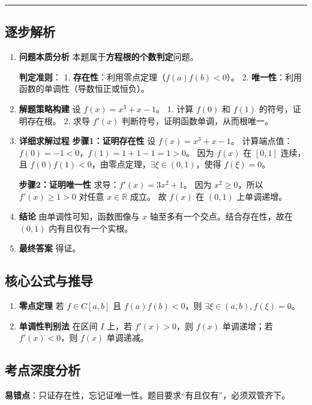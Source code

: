 \documentclass[UTF8]{ctexart}
\newenvironment{redenv}{\color{red}}{}
\newenvironment{detailedanalysis}{%
    \color{red}
    \begin{enumerate}[label=\textbf{第\arabic*步：}, leftmargin=*, align=left, itemsep=1.5ex]
}{%
    \end{enumerate}
}
\newenvironment{formuladerivation}{%
    \begin{enumerate}[label={\textbf{公式\arabic*：}}, leftmargin=*, align=left]
}{%
    \end{enumerate}
}
\newcommand{\analysisrule}{\noindent\rule{\textwidth}{0.8pt}\vspace{-0.8em}}
\begin{document}
\begin{redenv}
\analysisrule
\subsection*{逐步解析}

\begin{detailedanalysis}
\item \textbf{问题本质分析}
本题属于\textbf{方程根的个数判定}问题。
\begin{conceptbox}
\textbf{判定准则}：
1. \textbf{存在性}：利用零点定理（$f(a)f(b)<0$）。
2. \textbf{唯一性}：利用函数的单调性（导数恒正或恒负）。
\end{conceptbox}

\item \textbf{解题策略构建}
设 $f(x) = x^3 + x - 1$。
1. 计算 $f(0)$ 和 $f(1)$ 的符号，证明存在根。
2. 求导 $f'(x)$ 判断符号，证明函数单调，从而根唯一。

\item \textbf{详细求解过程}
\noindent\textbf{步骤1：证明存在性}
设 $f(x) = x^3 + x - 1$。
计算端点值：$f(0) = -1 < 0$，$f(1) = 1 + 1 - 1 = 1 > 0$。
因为 $f(x)$ 在 $[0, 1]$ 连续，且 $f(0)f(1) < 0$，由零点定理，$\exists \xi \in (0, 1)$，使得 $f(\xi) = 0$。

\noindent\textbf{步骤2：证明唯一性}
求导：$f'(x) = 3x^2 + 1$。
因为 $x^2 \ge 0$，所以 $f'(x) \ge 1 > 0$ 对任意 $x \in \mathbb{R}$ 成立。
故 $f(x)$ 在 $(0, 1)$ 上单调递增。

\item \textbf{结论}
由单调性可知，函数图像与 $x$ 轴至多有一个交点。结合存在性，故在 $(0, 1)$ 内有且仅有一个实根。

\item \textbf{最终答案}
得证。
\end{detailedanalysis}

\subsection*{核心公式与推导}
\begin{formuladerivation}
\item \textbf{零点定理}
若 $f \in C[a, b]$ 且 $f(a)f(b) < 0$，则 $\exists \xi \in (a, b), f(\xi)=0$。
\item \textbf{单调性判别法}
在区间 $I$ 上，若 $f'(x) > 0$，则 $f(x)$ 单调递增；若 $f'(x) < 0$，则 $f(x)$ 单调递减。
\end{formuladerivation}

\subsection*{考点深度分析}
\noindent\textbf{易错点}：只证存在性，忘记证唯一性。题目要求“有且仅有”，必须双管齐下。
\end{redenv}
\end{document}
